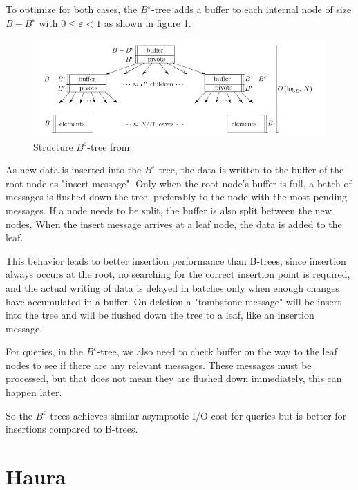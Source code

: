 \documentclass[
	12pt,
	a4paper,
	abstract,
	bibliography=totoc,
	chapterprefix,
	headings=openright,
	numbers=endperiod,
	parskip=half,
	twoside,
]{scrreprt}
\begin{document}
To optimize for both cases, the $B^{\varepsilon}$-tree adds a buffer to each internal node of size $B - B^{\varepsilon} $ with $ 0 \leq \varepsilon < 1$ as shown in figure \ref{fig:structure B-epsilon-tree}.

\begin{figure}[ht]
	\centering
	\includegraphics[scale=0.6]{B-epsilon_structure.png}
	\caption{Structure $B^{\varepsilon}$-tree from \cite{bender2015introduction}}
		\label{fig:structure B-epsilon-tree}
\end{figure}

As new data is inserted into the $B^{\varepsilon}$-tree, the data is written to the buffer of the root node as "insert message".
Only when the root node's buffer is full, a batch of messages is flushed down the tree, preferably to the node with the most pending messages. 
If a node needs to be split, the buffer is also split between the new nodes.
When the insert message arrives at a leaf node, the data is added to the leaf.

This behavior leads to better insertion performance than B-trees, since insertion always occurs at the root, no searching for the correct insertion point is required, and  
the actual writing of data is delayed in batches only when enough changes have accumulated in a buffer.
On deletion a "tombstone message" will be insert into the tree and will be flushed down the tree to a leaf, like an insertion message.

For queries, in the $B^{\varepsilon}$-tree, we also need to check buffer on the way to the leaf nodes to see if there are any relevant messages.
These messages must be processed, but that does not mean they are flushed down immediately, this can happen later.

So the $B^{\varepsilon}$-trees achieves similar asymptotic I/O cost for queries but is better for insertions compared to B-trees.


\section{Haura}
\end{document}
